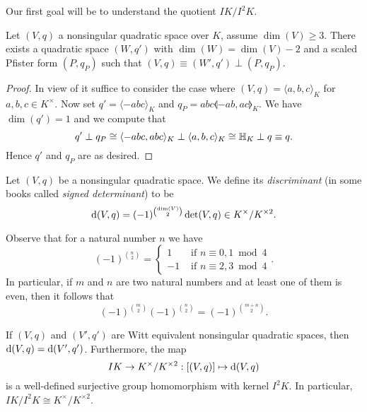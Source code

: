 \documentclass[12pt, leqno, british]{amsart}
\begin{document}
Our first goal will be to understand the quotient $I K/I^2K$.
\begin{lem}\label{L:split-off-2fold-Pfister}
Let $(V, q)$ a nonsingular quadratic space over $K$, assume $\dim(V) \geq 3$.
There exists a quadratic space $(W, q')$ with $\dim(W) = \dim(V) - 2$ and a scaled Pfister form $(P, q_P)$ such that $(V, q) \equiv (W', q') \perp (P, q_P)$.
\end{lem}
\begin{proof}
In view of  it suffice to consider the case where $(V, q) = \langle a, b, c \rangle_K$ for $a, b, c \in K^\times$.
Now set $q' = \langle -abc \rangle_K$ and $q_P = abc\llangle -ab, ac \rrangle_K$.
We have $\dim(q') = 1$ and we compute that
$$q' \perp q_P \cong \langle -abc , abc \rangle_K \perp \langle a, b, c \rangle_K \cong \mathbb{H}_K \perp q \equiv q.$$
Hence $q'$ and $q_P$ are as desired.
\end{proof}
\begin{defi}
Let $(V, q)$ be a nonsingular quadratic space.
We define its \emph{discriminant} (in some books called \emph{signed determinant}) to be
$$ \mathrm{d}(V, q) = (-1)^{\binom{\dim(V)}{2}} \det(V, q) \in K^\times/K^{\times 2}.$$
\end{defi}
Observe that for a natural number $n$ we have
\begin{equation*}\label{E:binom}
(-1)^{\binom{n}{2}} = \begin{cases}
1 &\text{ if } n \equiv 0, 1 \bmod 4 \\
-1 &\text{ if } n \equiv 2, 3 \bmod 4
\end{cases}.
\end{equation*}
In particular, if $m$ and $n$ are two natural numbers and at least one of them is even, then it follows that
\begin{equation}\label{E:binom2}
(-1)^{\binom{m}{2}}(-1)^{\binom{n}{2}} = (-1)^{\binom{m+n}{2}}.
\end{equation}
\begin{prop}\label{P:disc-map}
If $(V, q)$ and $(V', q')$ are Witt equivalent nonsingular quadratic spaces, then $\mathrm{d}(V, q) = \mathrm{d}(V', q')$.
Furthermore, the map
$$ IK \to K^\times/K^{\times 2} : [(V, q)] \mapsto \mathrm{d}(V, q) $$
is a well-defined surjective group homomorphism with kernel $I^2K$.
In particular, $IK/I^2K \cong K^\times / K^{\times 2}$.
\end{prop}
\end{document}
